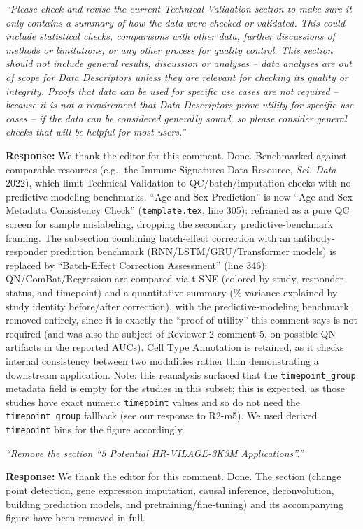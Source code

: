 \documentclass[11pt]{article}
\newcommand{\origcomment}[1]{\textit{``#1''}}
\newcommand{\filledresponse}[1]{%
  \par\medskip\noindent\textbf{Response:} #1\par
  \vspace{0.4cm}%
  \par\noindent\hrulefill\par\bigskip
}
\begin{document}
\begin{commentlist}
\item[E12.] \origcomment{Please check and revise the current Technical Validation section to make
sure it only contains a summary of how the data were checked or validated. This could include
statistical checks, comparisons with other data, further discussions of methods or limitations,
or any other process for quality control. This section should not include general results,
discussion or analyses -- data analyses are out of scope for Data Descriptors unless they are
relevant for checking its quality or integrity. Proofs that data can be used for specific use
cases are not required -- because it is not a requirement that Data Descriptors prove utility for
specific use cases -- if the data can be considered generally sound, so please consider general
checks that will be helpful for most users.}
\filledresponse{We thank the editor for this comment. Done. Benchmarked against comparable resources (e.g., the Immune Signatures Data
Resource, \textit{Sci. Data} 2022), which limit Technical Validation to QC/batch/imputation checks
with no predictive-modeling benchmarks. ``Age and Sex Prediction'' is now ``Age and Sex Metadata
Consistency Check'' (\texttt{template.tex}, line 305): reframed as a pure QC screen for sample
mislabeling, dropping the secondary predictive-benchmark framing. The subsection combining
batch-effect correction with an antibody-responder prediction benchmark (RNN/LSTM/GRU/Transformer
models) is replaced by ``Batch-Effect Correction Assessment'' (line 346): QN/ComBat/Regression are
compared via t-SNE (colored by study, responder status, and timepoint) and a quantitative summary
(\% variance explained by study identity before/after correction), with the predictive-modeling
benchmark removed entirely, since it is exactly the ``proof of utility'' this comment says is not
required (and was also the subject of Reviewer 2 comment 5, on possible QN artifacts in the
reported AUCs). Cell Type Annotation is retained, as it checks internal consistency between two
modalities rather than demonstrating a downstream application. Note: this reanalysis surfaced that
the \texttt{timepoint\_group} metadata field is empty for the studies in this subset; this is
expected, as those studies have exact numeric \texttt{timepoint} values and so do not need the
\texttt{timepoint\_group} fallback (see our response to R2-m5). We used derived \texttt{timepoint}
bins for the figure accordingly.}

\item[E13.] \origcomment{Remove the section ``5 Potential HR-VILAGE-3K3M Applications''.}
\filledresponse{We thank the editor for this comment. Done. The section (change point detection, gene expression imputation, causal
inference, deconvolution, building prediction models, and pretraining/fine-tuning) and its
accompanying figure have been removed in full.}


\end{commentlist}
\end{document}
